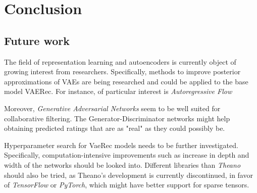 \chapter{Conclusion}

\section{Future work}

The field of representation learning and autoencoders is currently object of
growing interest from researchers. Specifically, methods to improve posterior
approximations of VAEs are being researched and could be applied to the base model
VAERec. For instance, of particular interest is \emph{Autoregressive Flow}
\cite{autoregressive_flow}

Moreover, \emph{Generative Adversarial Networks} \cite{GAN} seem to be well suited 
for collaborative filtering. The Generator-Discriminator networks might help
obtaining predicted ratings that are as "real" as they could possibly be.

Hyperparameter search for VaeRec models needs to be further
investigated. Specifically, computation-intensive improvements
such as increase in depth and width of the networks should be looked into.
Different libraries than \emph{Theano}\cite{theano} should also be tried, as Theano's
development is currently discontinued, in favor of \emph{TensorFlow}\cite{tensorflow}
or \emph{PyTorch}\cite{pytorch}, which might have better support for sparse tensors.
